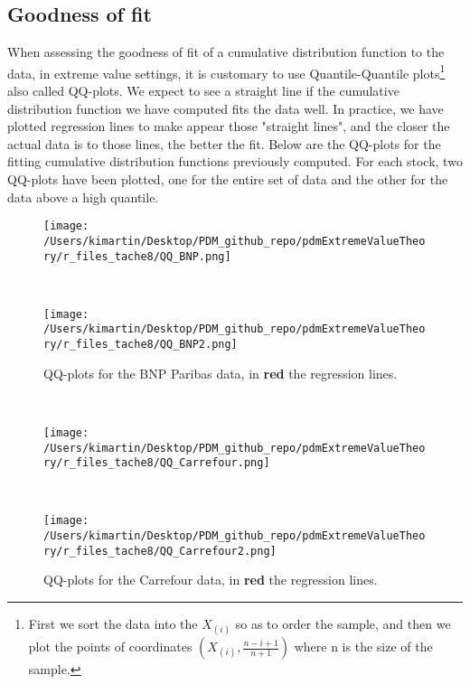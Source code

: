 \subsection{Goodness of fit}
When assessing the goodness of fit of a cumulative distribution function to the data, in extreme value settings, it is customary to use Quantile-Quantile plots\footnote{First we sort the data into the $X_{(i)}$ so as to order the sample, and then we plot the points of coordinates $(X_{(i)}, \frac{n - i + 1}{n + 1})$ where n is the size of the sample.} also called QQ-plots. We expect to see a straight line if the cumulative distribution function we have computed fits the data well. In practice, we have plotted regression lines to make appear those "straight lines", and the closer the actual data is to those lines, the better the fit. Below are the QQ-plots for the fitting cumulative distribution functions previously computed. For each stock, two QQ-plots have been plotted, one for the entire set of data and the other for the data above a high quantile.
\begin{figure}[h!]
	\centering
	\begin{minipage}[b]{0.4\textwidth}
		\centering
		\texttt{[image: /Users/kimartin/Desktop/PDM\_github\_repo/pdmExtremeValueTheory/r\_files\_tache8/QQ\_BNP.png]}
		\label{fig:QQBNP1}
	\end{minipage}
	~
	\begin{minipage}[b]{0.4\textwidth}
		\centering
		\texttt{[image: /Users/kimartin/Desktop/PDM\_github\_repo/pdmExtremeValueTheory/r\_files\_tache8/QQ\_BNP2.png]}
		\label{fig:QQBNP2}
	\end{minipage}
	\caption{QQ-plots for the BNP Paribas data, in \textbf{red} the regression lines.}
\end{figure}
\\
\begin{figure}[h!]
	\centering
	\begin{minipage}[b]{0.4\textwidth}
		\centering
		\texttt{[image: /Users/kimartin/Desktop/PDM\_github\_repo/pdmExtremeValueTheory/r\_files\_tache8/QQ\_Carrefour.png]}
		\label{fig:QQCarrefour1}
	\end{minipage}
	~
	\begin{minipage}[b]{0.4\textwidth}
		\centering
		\texttt{[image: /Users/kimartin/Desktop/PDM\_github\_repo/pdmExtremeValueTheory/r\_files\_tache8/QQ\_Carrefour2.png]}
		\label{fig:QQCarrefour2}
	\end{minipage}
	\caption{QQ-plots for the Carrefour data, in \textbf{red} the regression lines.}
\end{figure}
